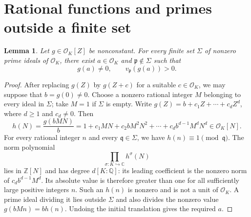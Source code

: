 \documentclass[11pt,a4paper]{article}
\newtheorem{lemma}[theorem]{Lemma}
\theoremstyle{definition}
\begin{document}
\section{Rational functions and primes outside a finite set}

\begin{lemma}\label{lb:prime-divisors}
Let $g\in\mathcal O_K[Z]$ be nonconstant. For every finite set
$\Sigma$ of nonzero prime ideals of $\mathcal O_K$, there exist
$a\in\mathcal O_K$ and $\mathfrak p\notin\Sigma$ such that
\[
                  g(a)\ne0,
          \qquad v_{\mathfrak p}(g(a))>0.
\]
\end{lemma}
\begin{proof}
After replacing $g(Z)$ by $g(Z+c)$ for a suitable $c\in\mathcal O_K$,
we may suppose that $b=g(0)\ne0$. Choose a nonzero rational integer
$M$ belonging to every ideal in $\Sigma$; take $M=1$ if $\Sigma$ is
empty. Write $g(Z)=b+c_1Z+\cdots+c_dZ^d$, where $d\ge1$ and $c_d\ne0$.
Then
\[
 h(N)=\frac{g(bMN)}b
      =1+c_1MN+c_2bM^2N^2+\cdots+c_db^{d-1}M^dN^d
      \in\mathcal O_K[N].
\]
For every rational integer $n$ and every $\mathfrak q\in\Sigma$,
we have $h(n)\equiv1\pmod{\mathfrak q}$. The norm polynomial
\[
                    \prod_{\sigma:K\hookrightarrow\mathbb C}h^\sigma(N)
\]
lies in $\mathbb Z[N]$ and has degree $d[K:\mathbb Q]$: its
leading coefficient is the nonzero norm of $c_db^{d-1}M^d$.
Its absolute value is therefore greater than one for all sufficiently
large positive integers $n$. Such an $h(n)$ is nonzero and is not a
unit of $\mathcal O_K$. A prime ideal dividing it lies outside
$\Sigma$ and also divides the nonzero value $g(bMn)=b h(n)$.
Undoing the initial translation gives the required $a$.
\end{proof}
\end{document}
